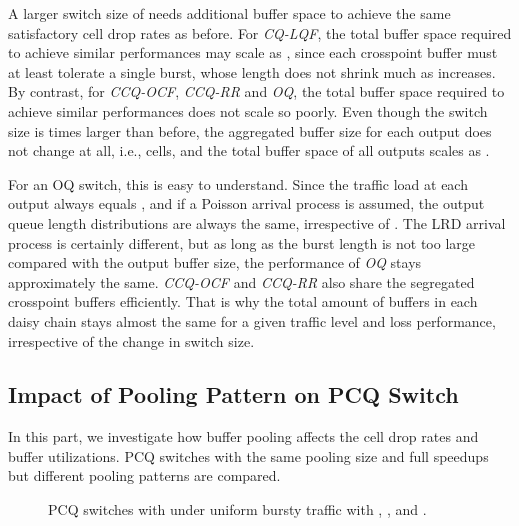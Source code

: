\documentclass[journal,final,doublecolumn,10pt,twoside]{IEEEtranTCOM} \normalsize
\begin{document}
A larger switch size of  needs additional buffer space to achieve the same satisfactory cell drop rates as before. For \emph{CQ-LQF}, the total buffer space required to achieve similar performances may scale as , since each crosspoint buffer must at least tolerate a single burst, whose length does not shrink much as  increases. By contrast, for \emph{CCQ-OCF}, \emph{CCQ-RR} and \emph{OQ}, the total buffer space required to achieve similar performances does not scale so poorly. Even though the switch size is  times larger than before, the aggregated buffer size for each output does not change at all, i.e.,  cells, and the total buffer space of all outputs scales as .

For an OQ switch, this is easy to understand. Since the traffic load at each output always equals , and if a Poisson arrival process is assumed, the output queue length distributions are always the same, irrespective of . The LRD arrival process is certainly different, but as long as the burst length is not too large compared with the output buffer size, the performance of \emph{OQ} stays approximately the same. \emph{CCQ-OCF} and \emph{CCQ-RR} also share the segregated crosspoint buffers efficiently. That is why the total amount of buffers in each daisy chain stays almost the same for a given traffic level and loss performance, irrespective of the change in switch size.

\subsection{Impact of Pooling Pattern on PCQ Switch}

In this part, we investigate how buffer pooling affects the cell drop rates and buffer utilizations.  PCQ switches with the same pooling size  and full speedups but different pooling patterns are compared.

\begin{figure}[ht]
\begin{minipage}[t]{3.2 in}
\centering {}
\end{minipage}
\begin{minipage}[t]{3.2 in}
\centering {}
\end{minipage}
\caption{ PCQ switches with  under uniform bursty traffic with , , and .}
\label{fig:PP}
\end{figure}
\end{document}
